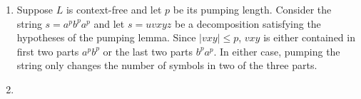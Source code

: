 \documentclass{article}
\theoremstyle{definition}
\theoremstyle{definition}
\theoremstyle{remark}
\begin{document}
\bigskip

\begin{enumerate}
    \item[$(i)$] Suppose $L$ is context-free and let $p$ be its pumping length. Consider the string $s=a^pb^pa^p$ and let $s=uvxyz$ be a decomposition satisfying the hypotheses of the pumping lemma. Since $|vxy|\leq p$, $vxy$ is either contained in first two parts $a^pb^p$ or the last two parts $b^pa^p$. In either case, pumping the string only changes the number of symbols in two of the three parts.
    
    \item[$(ii)$]\hspace*{1cm}

    \begin{center}
\end{center}
\end{enumerate}
\end{document}
